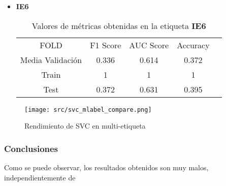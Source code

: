 \begin{itemize}
\begin{table}[H]
	      \end{table}
	\item  \textbf{IE6}
	      \begin{table}[H]
		      \centering
		      \begin{tabular}{|c|c|c|c|c}
			      \cline{1-4}
			      FOLD             & F1 Score & AUC Score & Accuracy \\ \cline{1-4}
			      Media Validación & 0.336    & 0.614     & 0.372    \\ \cline{1-4}
			      Train            & 1        & 1         & 1        \\ \cline{1-4}
			      Test             & 0.372    & 0.631     & 0.395    \\ \cline{1-4}
		      \end{tabular}
		      \caption{Valores de métricas obtenidas en la etiqueta \textbf{IE6}}
	      \end{table}
\end{itemize}

\begin{figure}[H]
	\centering
	\texttt{[image: src/svc\_mlabel\_compare.png]}
	\caption{Rendimiento de SVC en multi-etiqueta}
	\label{fig:svcml_cmp}
\end{figure}
\subsubsection*{Conclusiones}
Como se puede observar, los resultados obtenidos son muy malos, independientemente de
